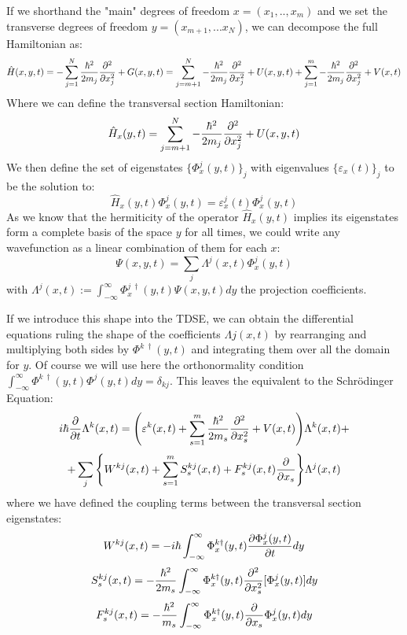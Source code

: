 \documentclass[11pt, a4paper]{article} %
\begin{document}
If we shorthand the "main" degrees of freedom $x=(x_1,..,x_m)$ and we set the transverse degrees of freedom $y=(x_{m+1},...x_N)$, we can decompose the full Hamiltonian as:
\begin{equation}
\hat{H}(x, y, t)= -\sum_{j=1}^N\frac{\hbar^2}{2m_j}\pdv[2]{}{x_j}+G(x, y, t)=\sum_{j=m+1}^{N}-\frac{\hbar^2}{2m_j}\pdv[2]{}{x_j}+U(x, y, t)+\sum_{j=1}^{m}-\frac{\hbar^2}{2m_j}\pdv[2]{}{x_j}+V(x,t)
\end{equation}
Where we can define the transversal section Hamiltonian:
\begin{equation}
\hat{H}_x(y,t)=\sum_{j=m+1}^{N}-\frac{\hbar^2}{2m_j}\pdv[2]{}{x_j}+U(x, y, t)
\end{equation} 
We then define the set of eigenstates $\{\Phi^j_x(y,t)\}_j$ with eigenvalues $\{\varepsilon_x(t)\}_j$ to be the solution to:
\begin{equation}
\hat{H}_x(y,t)\Phi^j_x(y,t)=\varepsilon^j_x(t)\Phi^j_x(y,t)
\end{equation}
As we know that the hermiticity of the operator $\hat{H}_x(y,t)$ implies its eigenstates form a complete basis of the space $y$ for all times, we could write any wavefunction as a linear combination of them for each $x$:
\begin{equation}
\Psi(x,y,t)=\sum_j \Lambda^j(x,t) \Phi^j_x(y,t)
\end{equation}
with $\Lambda^j(x,t):= \int_{-\infty}^{\infty}\Phi^{j\ \dagger}_x(y,t) \Psi(x,y,t)dy$ the projection coefficients.

If we introduce this shape into the TDSE, we can obtain the differential equations ruling the shape of the coefficients $\Lambda j(x,t)$ by rearranging and multiplying both sides by $\Phi^{k\ \dagger}(y,t)$ and integrating them over all the domain for $y$. Of course we will use here the orthonormality condition $\int_{-\infty}^{\infty}\Phi^{k\ \dagger}(y,t) \Phi^{j}(y,t) dy= \delta_{kj}$. This leaves the equivalent to the Schrödinger Equation:
\begin{equation}\label{XabEq}
i\hbar \pdv{}{t}\Lambda^k(x,t) = \qty( \varepsilon^k(x,t) + \sum_{s=1}^m\frac{\hbar^2}{2m_s}\pdv[2]{}{x_s}+V(x,t))\Lambda^k(x,t)+
\end{equation}
$$
 +\sum_j \qty{ W^{kj}(x,t) + \sum_{s=1}^m S^{kj}_s(x,t)+F^{kj}_s(x,t)\pdv{}{x_s} } \Lambda^j(x,t) 
$$
where we have defined the coupling terms between the transversal section eigenstates:
\begin{equation}
W^{kj}(x,t) = -i\hbar\int_{-\infty}^{\infty}\Phi_x^{k\dagger}(y,t) \pdv{\Phi^j_x(y,t)}{t} dy
\end{equation}
\begin{equation}\label{S}
S^{kj}_s(x,t) = -\frac{\hbar^2}{2m_s}\int_{-\infty}^{\infty}\Phi_x^{k\dagger}(y,t) \pdv[2]{}{x_s} [\Phi^j_x(y,t)] dy
\end{equation}
\begin{equation}\label{F}
F^{kj}_s(x,t) = -\frac{\hbar^2}{m_s}\int_{-\infty}^{\infty}\Phi_x^{k\dagger}(y,t) \pdv{}{x_s}\Phi^j_x(y,t) dy
\end{equation}
\end{document}
